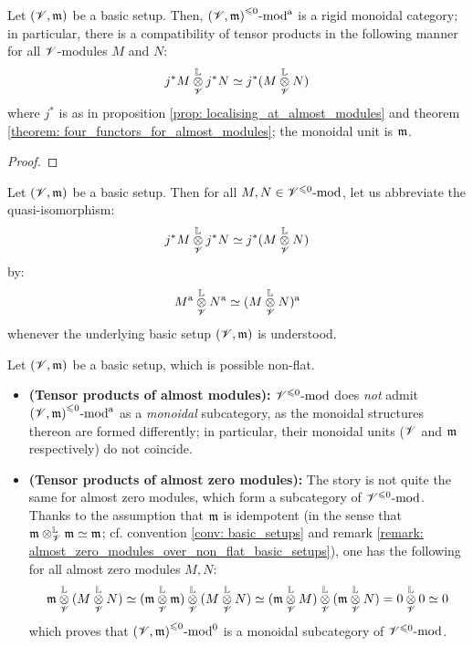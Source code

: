             \begin{proposition} \label{prop: tensor_products_of_almost_modules}
                Let $(\mathscr{V}, \mathfrak{m})$ be a basic setup. Then, ${(\mathscr{V}, \mathfrak{m})}^{\leqslant 0}\text{-}\mathrm{mod}^{\mathrm{a}}$ is a rigid monoidal category; in particular, there is a compatibility of tensor products in the following manner for all $\mathscr{V}$-modules $M$ and $N$:
                    $$j^*M \tensor^{\L}_{\scrV} j^*N \cong j^*(M \tensor^{\L}_{\scrV} N)$$
                where $j^*$ is as in proposition \ref{prop: localising_at_almost_modules} and theorem \ref{theorem: four_functors_for_almost_modules}; the monoidal unit is $\mathfrak{m}$.
            \end{proposition}
                \begin{proof}
                    
                \end{proof}
            \begin{convention} \label{conv: almost_tensor_products}
                Let $(\mathscr{V}, \mathfrak{m})$ be a basic setup. Then for all $M, N \in {\mathscr{V}}^{\leqslant 0}\text{-}\mathrm{mod}$, let us abbreviate the quasi-isomorphism:
                    $$j^*M \tensor^{\L}_{\scrV} j^*N \cong j^*(M \tensor^{\L}_{\scrV} N)$$
                by:
                    $$M^{\almost} \tensor^{\L}_{\scrV} N^{\almost} \cong (M \tensor^{\L}_{\scrV} N)^{\almost}$$
                whenever the underlying basic setup $(\mathscr{V}, \mathfrak{m})$ is understood.
            \end{convention}
            \begin{remark} \label{remark: incompatible_monoidal_structures_almost_modules}
                Let $(\mathscr{V}, \mathfrak{m})$ be a basic setup, which is possible non-flat.
                \begin{itemize}
                    \item \textbf{(Tensor products of almost modules):} ${\mathscr{V}}^{\leqslant 0}\text{-}\mathrm{mod}$ does \textit{not} admit ${(\mathscr{V}, \mathfrak{m})}^{\leqslant 0}\text{-}\mathrm{mod}^{\mathrm{a}}$ as a \textit{monoidal} subcategory, as the monoidal structures thereon are formed differently; in particular, their monoidal units ($\mathscr{V}$ and $\mathfrak{m}$ respectively) do not coincide.
                    \item \textbf{(Tensor products of almost zero modules):} The story is not quite the same for almost zero modules, which form a subcategory of ${\mathscr{V}}^{\leqslant 0}\text{-}\mathrm{mod}$. Thanks to the assumption that $\mathfrak{m}$ is idempotent (in the sense that $\m \tensor_{\scrV}^{\L} \m \cong \m$; cf. convention \ref{conv: basic_setups} and remark \ref{remark: almost_zero_modules_over_non_flat_basic_setups}), one has the following for all almost zero modules $M, N$:
                        $$\m \tensor_{\scrV}^{\L} (M \tensor_{\scrV}^{\L} N) \cong (\m \tensor_{\scrV}^{\L} \m) \tensor_{\scrV}^{\L} (M \tensor_{\scrV}^{\L} N) \cong (\m \tensor_{\scrV}^{\L} M) \tensor_{\scrV}^{\L} (\m \tensor_{\scrV}^{\L} N) = 0 \tensor_{\scrV}^{\L} 0 \cong 0$$
                    which proves that ${(\mathscr{V}, \mathfrak{m})}^{\leqslant 0}\text{-}\mathrm{mod}^0$ is a monoidal subcategory of ${\mathscr{V}}^{\leqslant 0}\text{-}\mathrm{mod}$. 
                \end{itemize}
            \end{remark}
            
